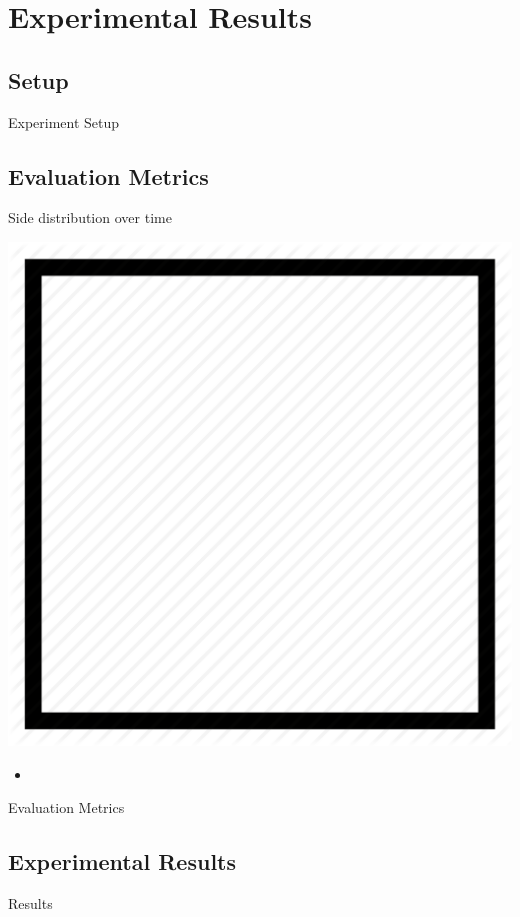 \section{Experimental Results}
\subsection{Setup}
\begin{frame}{Experiment Setup}
    
\end{frame}

\subsection{Evaluation Metrics}
\begin{frame}{Side distribution over time}
    \begin{center}
        \includegraphics[height=0.3\textheight]{assets/figures/square.png}
    \end{center}
    \begin{itemize}
        \item 
    \end{itemize}
\end{frame}
\begin{frame}{Evaluation Metrics}
    
\end{frame}
\subsection{Experimental Results}
\begin{frame}{Results}
    
\end{frame}